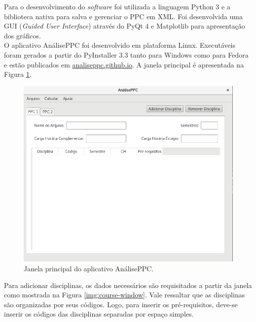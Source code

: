 \documentclass[a4paper, 12pt]{article}
\begin{document}
Para o desenvolvimento do \textit{software} foi utilizada a linguagem Python 3 e a biblioteca nativa para salva e gerenciar o PPC em XML. Foi desenvolvida uma 
GUI (\textit{Guided User Interface}) através do PyQt 4 e Matplotlib para apresentação dos gráficos. \\ 

O aplicativo AnálisePPC foi desenvolvido em plataforma Linux. Executáveis foram gerados a partir do PyInstaller 3.3 tanto para Windows como para Fedora e estão publicados em 
\url{analiseppc.github.io}. A janela principal é apresentada na Figura \ref{img:main-window}.

\begin{figure}[htb]
\centering
\includegraphics[scale=0.45]{main-window}
\caption{Janela principal do aplicativo AnálisePPC.}
\label{img:main-window}
\end{figure}

Para adicionar disciplinas, os dados necessários são requisitados a partir da janela como mostrada na Figura \ref{img:course-window}. Vale ressaltar que as 
disciplinas são organizadas por seus códigos. Logo, para inserir os pré-requisitos, deve-se inserir os códigos das disciplinas separadas por espaço simples. \\
\end{document}
